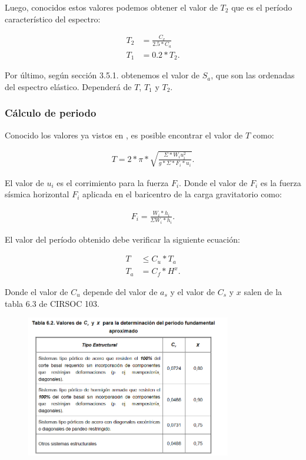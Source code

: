 \documentclass[../main.tex]{subfiles}
\begin{document}
Luego, conocidos estos valores podemos obtener el valor de $T_2$ que es el 
período característico del espectro:

\begin{align*}
  T_2 &= \frac{C_v}{2.5*C_a} \\[5pt]
  T_1 &= 0.2 * T_2
.\end{align*}

Por último, según sección 3.5.1. obtenemos el valor de $S_a$, que son las ordenadas
del espectro elástico. Dependerá de $T$, $T_1$ y $T_2$.

\subsubsection{Cálculo de periodo}


Conocido los valores ya vistos en , es posible encontrar el valor
de $T$ como:

\begin{align*}
  T = 2*\pi *\sqrt{\frac{\Sigma * W_i u_i^2}{g*\Sigma*F_i*u_i}} 
.\end{align*}

El valor de $u_i$ es el corrimiento para la fuerza  $F_i$.
Donde el valor de $F_i$ es la fuerza sísmica horizontal $F_i$ aplicada en el 
baricentro de la carga gravitatorio como:

 \begin{align*}
  F_i = \frac{W_i*h_i}{\Sigma W_i*h_i}
.\end{align*}

El valor del período obtenido debe verificar la siguiente ecuación:

\begin{align*}
  T &\leq C_u * T_a  \\[5pt]
  T_a &= C_f * H^x
.\end{align*}

Donde el valor de $C_u$ depende del valor de $a_s$ y el valor de  $C_s$ y $x$ salen
de la tabla 6.3 de CIRSOC 103.

\begin{figure}[ht]
  \centering
  \includegraphics[width=0.8\textwidth]{../images/20210420/tabla6_3}
\end{figure}
\end{document}
